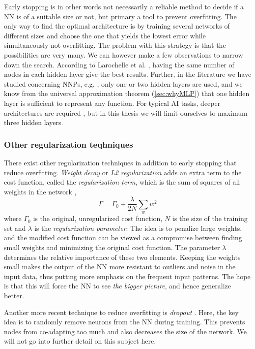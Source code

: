 \documentclass[twoside,english]{uiofysmaster}
\begin{document}
Early stopping is in other words not necessarily a reliable method to decide if a NN is of a suitable size or not, 
but primary a tool to prevent overfitting. 
The only way to find the optimal architecture is by training several networks of different sizes and choose the one that yields
the lowest error while simultaneously not overfitting. The problem with this strategy is that the possibilities are very many. 
We can however make a few observations to narrow down the search. 
According to Larochelle et al. \cite{Larochelle09}, having the same number of nodes in each hidden layer give the best results. 
Further, in the literature we have studied concerning NNPs, e.g. \cite{Behler07} \cite{Raff05} \cite{Witkoskie05}, 
only one or two hidden layers are used, and we know from the universal approximation theorem (\autoref{sec:whyMLP})
that one hidden layer is sufficient to represent any function. For typical AI tasks, deeper architectures are required 
\cite{Bengio07}, but in this thesis we will limit ourselves to maximum three hidden layers. 

\subsubsection{Other regularization teqhniques}
There exist other regularization techniques in addition to early stopping that reduce overfitting. 
\textit{Weight decay} or \textit{L2 regularization} adds an extra term to the cost function, called 
the \textit{regularization term}, which is the sum of squares of all weights in the network \cite{Krogh1992},
\begin{equation}
 \Gamma = \Gamma_0 + \frac{\lambda}{2N}\sum_w w^2
\end{equation}
where $\Gamma_0$ is the original, unregularized cost function, $N$ is the size of the training set and 
$\lambda$ is the \textit{regularization parameter}. The idea is to penalize large weights, and the modified 
cost function can be viewed as a compromise between finding small weights and minimizing the original cost function.
The parameter $\lambda$ determines the relative importance of these two elements. 
Keeping the weights small makes the output of the NN more resistant to outliers and noise in the input data, thus
putting more emphasis on the frequent input patterns. 
The hope is that this will force the NN to see \textit{the bigger picture}, 
and hence generalize better. 

Another more recent technique to reduce overfitting is \textit{dropout} \cite{Srivastava14}. Here, the key idea 
is to randomly remove neurons from the NN during training. This prevents nodes from co-adapting too much and 
also decreases the size of the network. We will not go into further detail on this subject here. 
\end{document}
